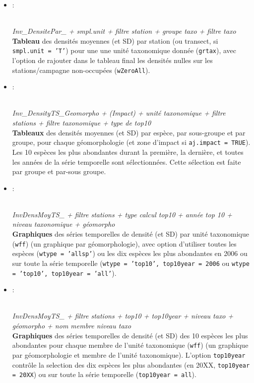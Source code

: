 \documentclass{article}
\begin{document}
\begin{itemize}
   \item[] \hypertarget{i6}{:}\\
\emph{Inv\_DensitePar\_ + smpl.unit + filtre station + groupe taxo + filtre taxo}\\
\textbf{Tableau} des densités moyennes (et SD) par station (ou
transect, si \texttt{smpl.unit = 'T'}) pour une
une unité taxonomique donnée (\texttt{grtax}), avec l'option de
rajouter dans le tableau final les densités nulles sur les
stations/campagne non-occupées (\texttt{wZeroAll}).

\item[] \hypertarget{i7}{:}\\
  \emph{Inv\_DensityTS\_Geomorpho + (Impact) + unité taxonomique +
    filtre stations + filtre taxonomique + type de top10}\\
  \textbf{Tableaux} des densités moyennes (et SD) par espèce, par
  sous-groupe et par groupe, pour chaque géomorphologie (et zone
  d'impact si \texttt{aj.impact = TRUE}). Les 10 espèces les plus
  abondantes durant la première, la
  dernière, et toutes les années de la série temporelle sont
  sélectionnées. Cette sélection est faite par groupe et par-sous
  groupe.

\item[] \hypertarget{i8}{:}\\
  \emph{InvDensMoyTS\_ + filtre stations + type calcul top10 + année
    top 10 + niveau taxonomique + géomorpho} \\
  \textbf{Graphiques} des séries temporelles de densité (et SD) par
  unité taxonomique (\texttt{wff}) (un graphique par géomorphologie),
  avec option d'utiliser toutes les espèces (\texttt{wtype = 'allsp'})
  ou les dix espèces les plus abondantes en 2006 ou sur toute la série
  temporelle (\texttt{wtype = 'top10', top10year = 2006} ou
  \texttt{wtype = 'top10', top10year = 'all'}).


\item[] \hypertarget{i9}{:}\\
        \emph{InvDensMoyTS\_ + filtre stations + top10 + top10year +
          niveau taxo + géomorpho + nom membre niveau taxo} \\

\textbf{Graphiques} des séries temporelles de densité (et SD) des 10
espèces les plus abondantes pour chaque membre de l'unité taxonomique
(\texttt{wff}) (un graphique par géomorphologie et
  membre de l'unité taxonomique). L'option \texttt{top10year} contrôle
  la selection des dix espèces les plus abondantes (en 20XX,
  \texttt{top10year = 20XX}) ou sur toute la série temporelle
  (\texttt{top10year = all}).

\end{itemize}
\end{document}
